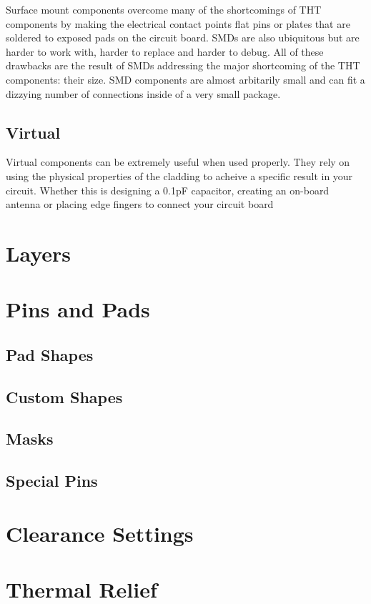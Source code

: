 Surface mount components overcome many of the shortcomings of THT components by making the electrical contact points flat pins or plates that are soldered to exposed pads on the circuit board.
SMDs are also ubiquitous but are harder to work with, harder to replace and harder to debug.
All of these drawbacks are the result of SMDs addressing the major shortcoming of the THT components: their size.
SMD components are almost arbitarily small and can fit a dizzying number of connections inside of a very small package.


\subsection{Virtual}

Virtual components can be extremely useful when used properly.
They rely on using the physical properties of the cladding to acheive a specific result in your circuit.
Whether this is designing a 0.1pF capacitor, creating an on-board antenna or placing edge fingers to connect your circuit board

\section{Layers}

\section{Pins and Pads}
\subsection{Pad Shapes}
\subsection{Custom Shapes}
\subsection{Masks}
\subsection{Special Pins}

\section{Clearance Settings}

\section{Thermal Relief}

